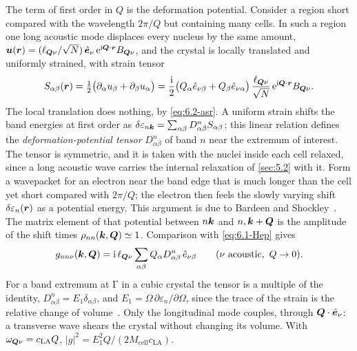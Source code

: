 The term of first order in $Q$ is the deformation potential. Consider a region short compared with the wavelength $2\pi/Q$ but containing many cells. In such a region one long acoustic mode displaces every nucleus by the same amount, $\bm{u}(\bm{r}) = (\ell_{\bm{Q}\nu}/\sqrt N)\,\hat{\bm{e}}_\nu\,\mathrm{e}^{\mathrm{i}\bm{Q}\cdot\bm{r}}B_{\bm{Q}\nu}$, and the crystal is locally translated and uniformly strained, with strain tensor
\begin{equation*}
  S_{\alpha\beta}(\bm{r}) = \tfrac12\bigl(\partial_\alpha u_\beta + \partial_\beta u_\alpha\bigr) = \frac{\mathrm{i}}{2}\bigl(Q_\alpha\hat e_{\nu\beta} + Q_\beta\hat e_{\nu\alpha}\bigr)\,\frac{\ell_{\bm{Q}\nu}}{\sqrt N}\,\mathrm{e}^{\mathrm{i}\bm{Q}\cdot\bm{r}}B_{\bm{Q}\nu} .
\end{equation*}
The local translation does nothing, by \cref{eq:6.2-asr}. A uniform strain shifts the band energies at first order as $\delta\varepsilon_{n\bm{k}} = \sum_{\alpha\beta}D^n_{\alpha\beta}S_{\alpha\beta}$; this linear relation defines the \emph{deformation-potential tensor} $D^n_{\alpha\beta}$ of band $n$ near the extremum of interest. The tensor is symmetric, and it is taken with the nuclei inside each cell relaxed, since a long acoustic wave carries the internal relaxation of \cref{sec:5.2} with it. Form a wavepacket for an electron near the band edge that is much longer than the cell yet short compared with $2\pi/Q$; the electron then feels the slowly varying shift $\delta\varepsilon_n(\bm{r})$ as a potential energy. This argument is due to Bardeen and Shockley~\cite{bardeen1950deformation}. The matrix element of that potential between $n\bm{k}$ and $n,\bm{k}+\bm{Q}$ is the amplitude of the shift times $\rho_{nn}(\bm{k},\bm{Q}) \simeq 1$. Comparison with \cref{eq:6.1-Hep} gives
\begin{equation}
  g_{nn\nu}(\bm{k},\bm{Q}) = \mathrm{i}\,\ell_{\bm{Q}\nu}\sum_{\alpha\beta}Q_\alpha D^n_{\alpha\beta}\,\hat e_{\nu\beta} \qquad (\nu \text{ acoustic},\ Q \to 0) .
  \label{eq:6.2-D}
\end{equation}
For a band extremum at $\mathrm{\Gamma}$ in a cubic crystal the tensor is a multiple of the identity, $D^n_{\alpha\beta} = E_1\delta_{\alpha\beta}$, and $E_1 = \Omega\,\partial\varepsilon_n/\partial\Omega$, since the trace of the strain is the relative change of volume~\cite[Eq.~(6)]{giustino2017electron}. Only the longitudinal mode couples, through $\bm{Q}\cdot\hat{\bm{e}}_\nu$: a transverse wave shears the crystal without changing its volume. With $\omega_{\bm{Q}\nu} = c_{\mathrm{LA}}Q$, $|g|^2 = E_1^2Q/(2M_{\mathrm{cell}}c_{\mathrm{LA}})$.

